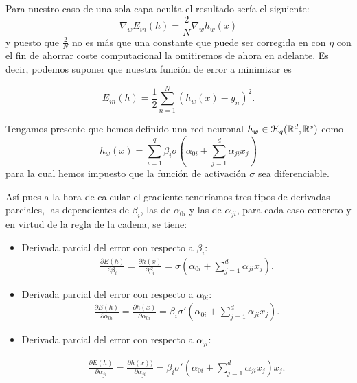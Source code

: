 Para nuestro caso de una sola capa oculta el resultado sería el siguiente: 
\begin{equation}
    \nabla_w E_{in}(h) = \frac{2}{N} \nabla_w h_w(x)
\end{equation}
y puesto que $\frac{2}{N}$ no es más que una constante que 
puede ser corregida en  con $\eta$ con el fin de ahorrar coste computacional la 
omitiremos de ahora en adelante. Es decir, podemos suponer que 
nuestra función de error a minimizar es 

\begin{equation}
    E_{in}(h) = \frac{1}{2} \sum^N_{n=1} (h_w(x)- y_n)^2. 
\end{equation}

Tengamos presente que hemos definido una red neuronal  $h_w \in \mathcal{H}_q (\mathbb{R}^d, \mathbb{R}^s)$ como
\begin{equation}
    h_w(x) = 
    \sum_{i=1}^q \beta_i 
    \sigma
    \left(  
        \alpha_{0 i} +
        \sum_{j=1}^d \alpha_{j i}x_j
    \right)
\end{equation}
para la cual hemos impuesto que la función de activación $\sigma$ sea diferenciable.

Así pues a la hora de calcular el gradiente tendríamos tres tipos de derivadas parciales, las dependientes de $\beta_i$, 
las de $\alpha_{0 i}$ y las de $\alpha_{j i}$, para cada caso concreto y en virtud de la regla de la cadena, se tiene: 
\begin{itemize}
    \item Derivada parcial del error con respecto a $\beta_i$:
    \begin{align} \label{eq:parcial_beta}
        \frac{\partial E(h)}{\partial \beta_i} 
        =
        \frac{\partial h(x)}{\partial \beta_i} 
        = 
        \sigma
    \left(  
        \alpha_{0 i} +
        \sum_{j=1}^d \alpha_{j i}x_j
    \right).
    \end{align}

    \item Derivada parcial del error con respecto a $\alpha_{0 i}$:
    \begin{align} \label{eq:parcial_alpha_cero}
        \frac{\partial E(h)}{\partial \alpha_{0 i}} 
        =
        \frac{\partial h(x)}{\partial \alpha_{0 i}} 
        = 
        \beta_i \sigma'
    \left(  
        \alpha_{0 i} +
        \sum_{j=1}^d \alpha_{j i}x_j
    \right).
    \end{align}

    \item Derivada parcial del error con respecto a $\alpha_{j i}$:
    
    \begin{align} \label{eq:parcial_alpha_i}
        \frac{\partial E(h)}{\partial \alpha_{j i}} 
        =
        \frac{\partial h(x))}{\partial \alpha_{j i}} 
        = 
        \beta_i \sigma'
    \left(  
        \alpha_{0 i} +
        \sum_{j=1}^d \alpha_{j i}x_j
    \right) x_j.
    \end{align}
\end{itemize}  

